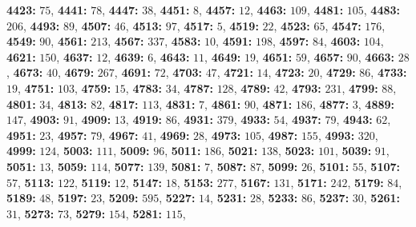 \textsf{\bfseries 4423:} $75$, \textsf{\bfseries 4441:} $78$, \textsf{\bfseries 4447:} $38$, \textsf{\bfseries 4451:} $8$, \textsf{\bfseries 4457:} $12$, \textsf{\bfseries 4463:} $109$, \textsf{\bfseries 4481:} $105$, \textsf{\bfseries 4483:} $206$, \textsf{\bfseries 4493:} $89$, \textsf{\bfseries 4507:} $46$, \textsf{\bfseries 4513:} $97$, \textsf{\bfseries 4517:} $5$, \textsf{\bfseries 4519:} $22$, \textsf{\bfseries 4523:} $65$, \textsf{\bfseries 4547:} $176$, \textsf{\bfseries 4549:} $90$, \textsf{\bfseries 4561:} $213$, \textsf{\bfseries 4567:} $337$, \textsf{\bfseries 4583:} $10$, \textsf{\bfseries 4591:} $198$, \textsf{\bfseries 4597:} $84$, \textsf{\bfseries 4603:} $104$, \textsf{\bfseries 4621:} $150$, \textsf{\bfseries 4637:} $12$, \textsf{\bfseries 4639:} $6$, \textsf{\bfseries 4643:} $11$, \textsf{\bfseries 4649:} $19$, \textsf{\bfseries 4651:} $59$, \textsf{\bfseries 4657:} $90$, \textsf{\bfseries 4663:} $28$, \textsf{\bfseries 4673:} $40$, \textsf{\bfseries 4679:} $267$, \textsf{\bfseries 4691:} $72$, \textsf{\bfseries 4703:} $47$, \textsf{\bfseries 4721:} $14$, \textsf{\bfseries 4723:} $20$, \textsf{\bfseries 4729:} $86$, \textsf{\bfseries 4733:} $19$, \textsf{\bfseries 4751:} $103$, \textsf{\bfseries 4759:} $15$, \textsf{\bfseries 4783:} $34$, \textsf{\bfseries 4787:} $128$, \textsf{\bfseries 4789:} $42$, \textsf{\bfseries 4793:} $231$, \textsf{\bfseries 4799:} $88$, \textsf{\bfseries 4801:} $34$, \textsf{\bfseries 4813:} $82$, \textsf{\bfseries 4817:} $113$, \textsf{\bfseries 4831:} $7$, \textsf{\bfseries 4861:} $90$, \textsf{\bfseries 4871:} $186$, \textsf{\bfseries 4877:} $3$, \textsf{\bfseries 4889:} $147$, \textsf{\bfseries 4903:} $91$, \textsf{\bfseries 4909:} $13$, \textsf{\bfseries 4919:} $86$, \textsf{\bfseries 4931:} $379$, \textsf{\bfseries 4933:} $54$, \textsf{\bfseries 4937:} $79$, \textsf{\bfseries 4943:} $62$, \textsf{\bfseries 4951:} $23$, \textsf{\bfseries 4957:} $79$, \textsf{\bfseries 4967:} $41$, \textsf{\bfseries 4969:} $28$, \textsf{\bfseries 4973:} $105$, \textsf{\bfseries 4987:} $155$, \textsf{\bfseries 4993:} $320$, \textsf{\bfseries 4999:} $124$, \textsf{\bfseries 5003:} $111$, \textsf{\bfseries 5009:} $96$, \textsf{\bfseries 5011:} $186$, \textsf{\bfseries 5021:} $138$, \textsf{\bfseries 5023:} $101$, \textsf{\bfseries 5039:} $91$, \textsf{\bfseries 5051:} $13$, \textsf{\bfseries 5059:} $114$, \textsf{\bfseries 5077:} $139$, \textsf{\bfseries 5081:} $7$, \textsf{\bfseries 5087:} $87$, \textsf{\bfseries 5099:} $26$, \textsf{\bfseries 5101:} $55$, \textsf{\bfseries 5107:} $57$, \textsf{\bfseries 5113:} $122$, \textsf{\bfseries 5119:} $12$, \textsf{\bfseries 5147:} $18$, \textsf{\bfseries 5153:} $277$, \textsf{\bfseries 5167:} $131$, \textsf{\bfseries 5171:} $242$, \textsf{\bfseries 5179:} $84$, \textsf{\bfseries 5189:} $48$, \textsf{\bfseries 5197:} $23$, \textsf{\bfseries 5209:} $595$, \textsf{\bfseries 5227:} $14$, \textsf{\bfseries 5231:} $28$, \textsf{\bfseries 5233:} $86$, \textsf{\bfseries 5237:} $30$, \textsf{\bfseries 5261:} $31$, \textsf{\bfseries 5273:} $73$, \textsf{\bfseries 5279:} $154$, \textsf{\bfseries 5281:} $115$, 
